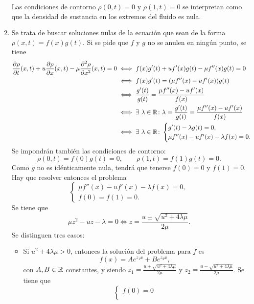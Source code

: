 \documentclass[11pt]{report}
\begin{document}
\begin{solution}
\begin{enumerate}
        Las condiciones de contorno $\rho(0,t) = 0$ y $\rho(1,t) = 0$ se interpretan como que la densidad de sustancia en los extremos del fluido es nula.
        \item Se trata de buscar soluciones nulas de la ecuación que sean de la forma $\rho(x,t) = f(x)g(t)$. Si se pide que $f$ y $g$ no se anulen en ningún punto, se tiene
        \begin{align*}
            \frac{\partial\rho}{\partial t}(x,t)+u\frac{\partial\rho}{\partial x}(x,t) - \mu\frac{\partial^2\rho}{\partial x^2}(x,t) = 0 &\iff f(x)g'(t)+uf'(x)g(t)-\mu f''(x)g(t) = 0 \\
            &\iff f(x)g'(t) = (\mu f''(x)-uf'(x))g(t) \\
            &\iff \frac{g'(t)}{g(t)} = \frac{\mu f''(x)-uf'(x)}{f(x)} \\
            &\iff \exists \ \lambda\in\mathbb R \colon \lambda = \frac{g'(t)}{g(t)} = \frac{\mu f''(x)-uf'(x)}{f(x)} \\
            &\iff \exists \ \lambda\in\mathbb R \colon \begin{cases}
                g'(t)-\lambda g(t) = 0, \\
                \mu f''(x) - uf'(x) - \lambda f(x) = 0.
            \end{cases} \\
        \end{align*}
        Se impondrán también las condiciones de contorno:
        \[\rho(0,t) = f(0)g(t) = 0, \qquad \rho(1,t) = f(1)g(t) = 0.\]
        Como $g$ no es idénticamente nula, tendrá que tenerse $f(0) = 0$ y $f(1) = 0$. Hay que resolver entonces el problema
        \[\begin{cases}
            \mu f''(x) - uf'(x) - \lambda f(x) = 0, \\
            f(0) = f(1) = 0.
        \end{cases}\]
        Se tiene que
        \[\mu z^2-uz-\lambda = 0 \iff z = \frac{u\pm\sqrt{u^2+4\lambda\mu}}{2\mu}.\]
        Se distinguen tres casos:
        \begin{itemize}
            \item Si $u^2+4\lambda\mu > 0$, entonces la solución del problema para $f$ es
            \[f(x) = Ae^{z_1x}+Be^{z_2 x},\]
            con $A,B\in\mathbb R$ constantes, y siendo $z_1 = \frac{u+\sqrt{u^2+4\lambda\mu}}{2\mu}$ y $z_2 = \frac{u-\sqrt{u^2+4\lambda\mu}}{2\mu}$. Se tiene que
            \[\begin{cases}
                f(0)=0 \\

\end{cases}\]
\end{itemize}
\end{enumerate}
\end{solution}
\end{document}
